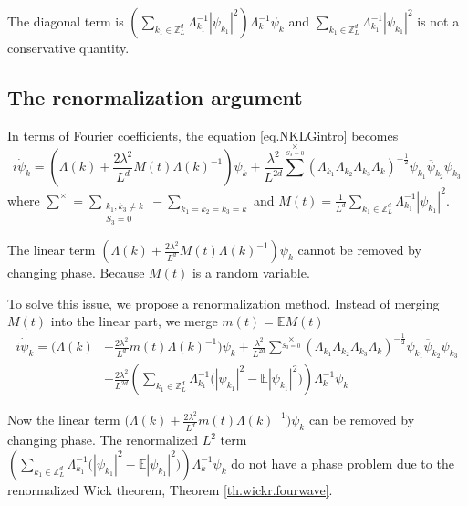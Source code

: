 The diagonal term is $\left(\sum\limits_{k_1\in \mathbb{Z}^d_L} \Lambda_{k_1}^{-1}|\psi_{k_1}|^2 \right)\Lambda_{k}^{-1}\psi_{k}$ and $\sum\limits_{k_1\in \mathbb{Z}^d_L} \Lambda_{k_1}^{-1}|\psi_{k_1}|^2$ is not a conservative quantity.

\subsection{The renormalization argument}

In terms of Fourier coefficients, the equation \eqref{eq.NKLGintro} becomes
\begin{equation}\label{eq.underrenormintro}
    i \dot{\psi}_{k} 
    = \left(\Lambda(k)+\frac{2\lambda^2}{L^{d}} M(t)\Lambda(k)^{-1}\right) \psi_k
    +\frac{\lambda^2}{L^{2d}} \sum^{\times}\limits_{S_3=0} (\Lambda_{k_1}\Lambda_{k_2}\Lambda_{k_3}\Lambda_{k})^{-\frac{1}{2}}\psi_{k_1}\overline{\psi}_{k_2}  \psi_{k_3}
\end{equation}
where $\sum^{\times}=\sum\limits_{\substack{k_1, k_3\neq k \\ S_3=0}}-\sum_{k_1=k_2=k_3=k}$ and $M(t)=\frac{1}{L^{d}} \sum\limits_{k_1\in \mathbb{Z}^d_L} \Lambda_{k_1}^{-1}|\psi_{k_1}|^2$.


The linear term $\left(\Lambda(k)+\frac{2\lambda^2}{L^{d}} M(t)\Lambda(k)^{-1}\right) \psi_k$ cannot be removed by changing phase. Because $M(t)$ is a random variable.
    
To solve this issue, we propose a renormalization method. Instead of merging $M(t)$ into the linear part, we merge $m(t)=\mathbb{E}M(t)$  
\begin{equation}\label{eq.renormalized'intro}
    \begin{split}
    i \dot{\psi}_{k} 
    =  \bigg(\Lambda(k)&+\frac{2\lambda^2}{L^{d}} m(t)\Lambda(k)^{-1}\bigg) \psi_k
    +\frac{\lambda^2}{L^{2d}} \sum^{\times}\limits_{S_3=0} (\Lambda_{k_1}\Lambda_{k_2}\Lambda_{k_3}\Lambda_{k})^{-\frac{1}{2}}\psi_{k_1}\overline{\psi}_{k_2}  \psi_{k_3}
    \\
    &+\frac{2\lambda^2}{L^{2d}} \left(\sum\limits_{k_1\in \mathbb{Z}^d_L} \Lambda_{k_1}^{-1}\Big(|\psi_{k_1}|^2-\mathbb{E} |\psi_{k_1}|^2\Big) \right) \Lambda_{k}^{-1}\psi_{k}    
    \end{split}
\end{equation}
    
Now the linear term $\bigg(\Lambda(k)+\frac{2\lambda^2}{L^{d}} m(t)\Lambda(k)^{-1}\bigg) \psi_k$ can be removed by changing phase. The renormalized $L^2$ term $\left(\sum\limits_{k_1\in \mathbb{Z}^d_L} \Lambda_{k_1}^{-1}\Big(|\psi_{k_1}|^2-\mathbb{E} |\psi_{k_1}|^2\Big) \right) \Lambda_{k}^{-1}\psi_{k}$ do not have a phase problem due to the renormalized Wick theorem, Theorem \ref{th.wickr.fourwave}.
    

